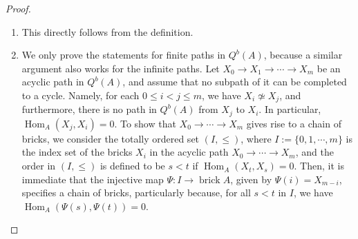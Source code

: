 \documentclass[10pt,a4paper]{amsart}
\DeclareMathOperator*{\brick}{brick}
\newcommand{\Hom}{\operatorname{Hom}}
\begin{document}
\begin{proof}
\begin{enumerate}
    \item This directly follows from the definition.

    \item We only prove the statements for finite paths in $Q^b(A)$, because a similar argument also works for the infinite paths. 
    Let $X_0 \to X_1 \to \cdots \to X_m$ be an acyclic path in $Q^b(A)$, and assume that no subpath of it can be completed to a cycle. Namely, for each $0 \leq i < j \leq m$, we have $X_i \not\simeq X_j$, and furthermore, there is no path in $Q^b(A)$ from $X_j$ to $X_i$. In particular, $\Hom_A(X_j,X_i)=0$. To show that $X_0 \to \cdots \to X_m$  gives rise to a chain of bricks, we consider the totally ordered set $(I,\leq)$, where $I:=\{0,1, \cdots,m\}$ is the index set of the bricks $X_i$ in the acyclic path $X_0 \to \cdots \to X_m$, and the order in $(I,\leq)$ is defined to be $s < t$ if $\Hom_A(X_t,X_s)=0$. 
    Then, it is immediate that the injective map $\Psi: I \rightarrow \brick A$, given by $\Psi(i)=X_{m-i}$, specifies a chain of bricks, particularly because, for all $s < t$ in $I$, we have $\Hom_A(\Psi(s),\Psi(t))=0$.
\end{enumerate}
\end{proof}
\end{document}
